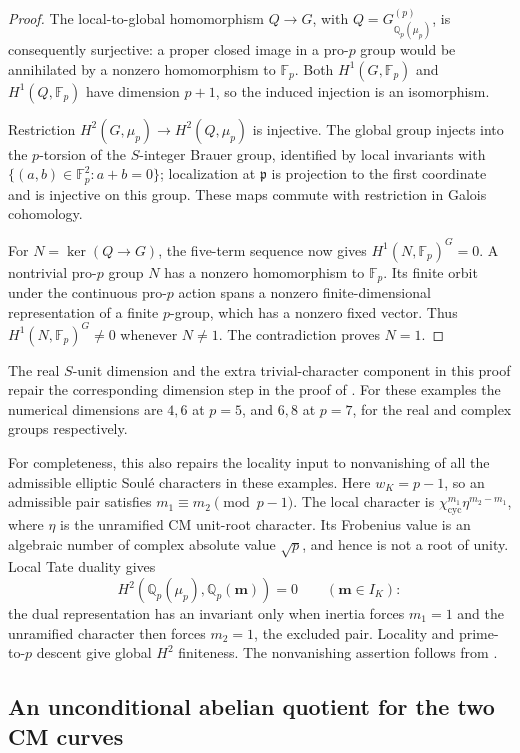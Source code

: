 \begin{proof}
The local-to-global homomorphism \(Q\to G\), with
\(Q=G_{\mathbb Q_p(\mu_p)}^{(p)}\), is consequently
surjective: a proper closed image in a pro-\(p\) group
would be annihilated by a nonzero homomorphism to
\(\mathbb F_p\). Both \(H^1(G,\mathbb F_p)\) and
\(H^1(Q,\mathbb F_p)\) have dimension \(p+1\), so the
induced injection is an isomorphism.

Restriction \(H^2(G,\mu_p)\to H^2(Q,\mu_p)\) is
injective. The global group injects into the
\(p\)-torsion of the \(S\)-integer Brauer group, identified
by local invariants with
\(\{(a,b)\in\mathbb F_p^2:a+b=0\}\); localization at
\(\mathfrak p\) is projection to the first coordinate
and is injective on this group. These maps commute
with restriction in Galois cohomology.

For \(N=\ker(Q\to G)\), the five-term sequence now
gives \(H^1(N,\mathbb F_p)^G=0\).
A nontrivial pro-\(p\) group \(N\) has a nonzero
homomorphism to \(\mathbb F_p\). Its finite orbit
under the continuous pro-\(p\) action spans a nonzero
finite-dimensional representation of a finite
\(p\)-group, which has a nonzero fixed vector.
Thus \(H^1(N,\mathbb F_p)^G\ne0\) whenever \(N\ne1\).
The contradiction proves \(N=1\).
\end{proof}

The real \(S\)-unit dimension and the extra trivial-character
component in this proof repair the corresponding dimension
step in the proof of \cite[Theorem A.1, pp.~28--29]{Ishii}.
For these examples the numerical dimensions are \(4,6\) at
\(p=5\), and \(6,8\) at \(p=7\), for the real and complex
groups respectively.

For completeness, this also repairs the locality input to
nonvanishing of all the admissible elliptic Soul\'e characters
in these examples. Here \(w_K=p-1\), so an admissible pair
satisfies \(m_1\equiv m_2\pmod{p-1}\). The local character is
\(\chi_{\mathrm{cyc}}^{m_1}\eta^{m_2-m_1}\), where \(\eta\)
is the unramified CM unit-root character. Its Frobenius
value is an algebraic number of complex absolute value
\(\sqrt p\), and hence is not a root of unity.
Local Tate duality gives
\[
 H^2(\mathbb Q_p(\mu_p),\mathbb Q_p(\boldsymbol m))=0
 \qquad(\boldsymbol m\in I_K):
\]
the dual representation has an invariant only when inertia
forces \(m_1=1\) and the unramified character then forces
\(m_2=1\), the excluded pair. Locality and prime-to-\(p\)
descent give global \(H^2\) finiteness. The nonvanishing
assertion follows from \cite[Theorem 2.8(2), p.~9]{Ishii}.

\subsection{An unconditional abelian quotient for the two CM curves}

